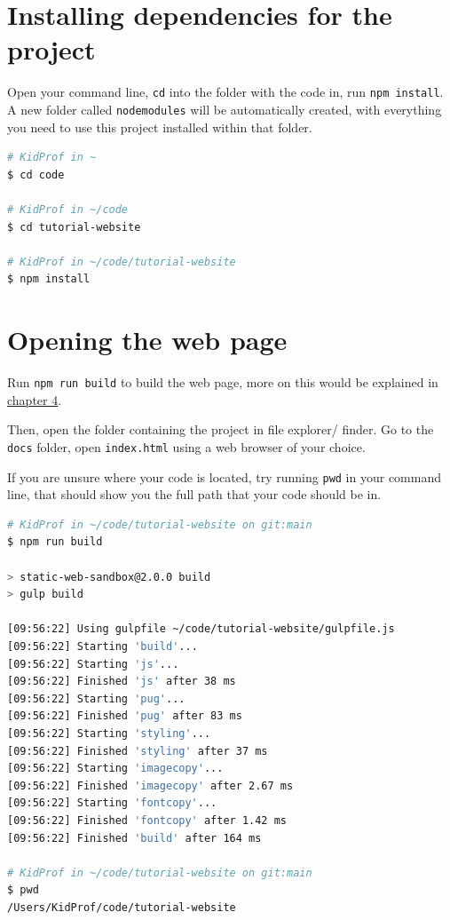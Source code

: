 \section{Installing dependencies for the project}

Open your command line, \texttt{cd} into the folder with the code in, run \texttt{npm install}. A new folder called \texttt{node\textunderscore modules} will be automatically created, with everything you need to use this project installed within that folder.

\begin{lstlisting}[language=bash]
# KidProf in ~
$ cd code

# KidProf in ~/code
$ cd tutorial-website

# KidProf in ~/code/tutorial-website
$ npm install
\end{lstlisting}

\section{Opening the web page}

Run \texttt{npm run build} to build the web page, more on this would be explained in \hyperref[sec:ch4]{chapter 4}.

Then, open the folder containing the project in file explorer/ finder. Go to the \texttt{docs} folder, open \texttt{index.html} using a web browser of your choice.

If you are unsure where your code is located, try running \texttt{pwd} in your command line, that should show you the full path that your code should be in.

\begin{lstlisting}[language=bash]
# KidProf in ~/code/tutorial-website on git:main 
$ npm run build

> static-web-sandbox@2.0.0 build
> gulp build

[09:56:22] Using gulpfile ~/code/tutorial-website/gulpfile.js
[09:56:22] Starting 'build'...
[09:56:22] Starting 'js'...
[09:56:22] Finished 'js' after 38 ms
[09:56:22] Starting 'pug'...
[09:56:22] Finished 'pug' after 83 ms
[09:56:22] Starting 'styling'...
[09:56:22] Finished 'styling' after 37 ms
[09:56:22] Starting 'imagecopy'...
[09:56:22] Finished 'imagecopy' after 2.67 ms
[09:56:22] Starting 'fontcopy'...
[09:56:22] Finished 'fontcopy' after 1.42 ms
[09:56:22] Finished 'build' after 164 ms

# KidProf in ~/code/tutorial-website on git:main 
$ pwd
/Users/KidProf/code/tutorial-website
\end{lstlisting}

